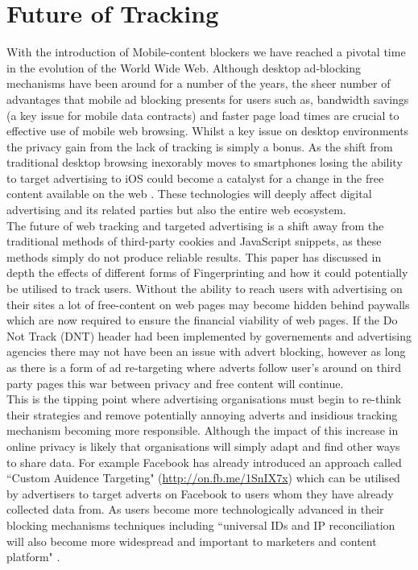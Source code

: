 \documentclass[12pt]{article}
\begin{document}
\section{Future of Tracking}
With the introduction of Mobile-content blockers we have reached a pivotal time in the evolution of the World Wide Web. Although desktop ad-blocking mechanisms have been around for a number of the years, the sheer number of advantages that mobile ad blocking presents for users such as, bandwidth savings (a key issue for mobile data contracts) and faster page load times are crucial to effective use of mobile web browsing. Whilst a key issue on desktop environments the privacy gain from the lack of tracking is simply a bonus. As the shift from traditional desktop browsing inexorably moves to smartphones losing the ability to target advertising to iOS could become a catalyst for a change in the free content available on the web \parencite{tippingPoint}. These technologies will deeply affect digital advertising and its related parties but also the entire web ecosystem. \\

The future of web tracking and targeted advertising is a shift away from the traditional methods of third-party cookies and JavaScript snippets, as these methods simply do not produce reliable results. This paper has discussed in depth the effects of different forms of Fingerprinting and how it could potentially be utilised to track users. Without the ability to reach users with advertising on their sites a lot of free-content on web pages may become hidden behind paywalls which are now required to ensure the financial viability of web pages. If the Do Not Track (DNT) header had been implemented by governements and advertising agencies there may not have been an issue with advert blocking, however as long as there is a form of ad re-targeting where adverts follow user's around on third party pages this war between privacy and free content will continue.  \\

This is the tipping point where advertising organisations must begin to re-think their strategies and remove potentially annoying adverts and insidious tracking mechanism becoming more responsible. Although the impact of this increase in online privacy is likely that organisations will simply adapt and find other ways to share data. For example Facebook has already introduced an approach called ``Custom Auidence Targeting" (\url{http://on.fb.me/1SnIX7x}) which can be utilised by advertisers to target adverts on Facebook to users whom they have already collected data from. As users become more technologically advanced in their blocking mechanisms techniques including ``universal IDs and IP reconciliation will also become more widespread and important to marketers and content platform" \parencite{tippingPoint}.
\end{document}
